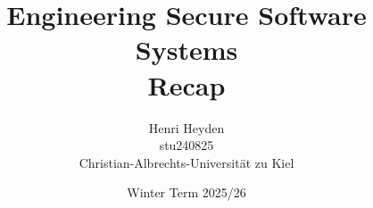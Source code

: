 


\title{Engineering Secure Software Systems \\ \small Recap}
\date{Winter Term 2025/26}
\author{Henri Heyden \\%
    \small stu240825 \\%
    \small Christian-Albrechts-Universität zu Kiel%
}


\maketitle
\restoregeometry %

\tableofcontents






